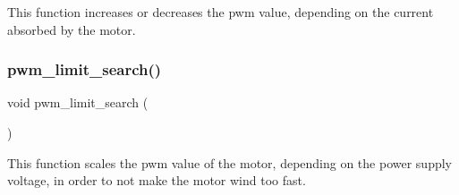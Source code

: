 This function increases or decreases the pwm value, depending on the current absorbed by the motor. \mbox{\label{interruptions_8h_ab7b287cf5df2ea548297b951be2f20d4}} 
\subsubsection{pwm\+\_\+limit\+\_\+search()}
{\footnotesize\ttfamily void pwm\+\_\+limit\+\_\+search (\begin{DoxyParamCaption}{ }\end{DoxyParamCaption})}

This function scales the pwm value of the motor, depending on the power supply voltage, in order to not make the motor wind too fast. 